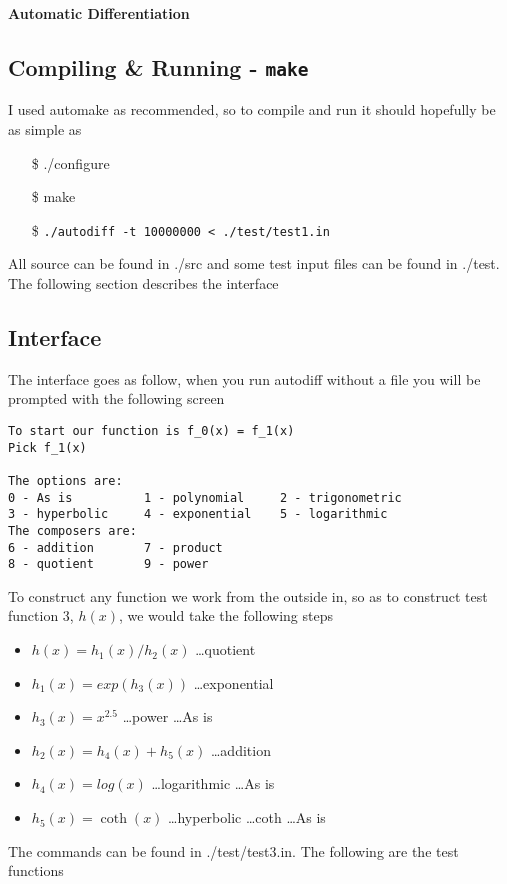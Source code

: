 \documentclass[11pt]{article}
\begin{document}
\vspace*{2mm}
\noindent
{\centering\textbf{\Large Automatic Differentiation}\\}
\vspace*{5mm}

\subsection*{Compiling \& Running - \texttt{make}}
I used automake as recommended, so to compile and run it should hopefully be as simple as
\begin{itemize}
\item[\$] ./configure
\item[\$] make
\item[\$] \texttt{./autodiff -t 10000000 < ./test/test1.in}  
\end{itemize}  
All source can be found in ./src and some test input files can be found in ./test. The following section describes the interface

\subsection*{Interface}

The interface goes as follow, when you run autodiff without a file you will be prompted with the following screen
\begin{lstlisting}[frame=single]
To start our function is f_0(x) = f_1(x)
Pick f_1(x)

The options are:
0 - As is          1 - polynomial     2 - trigonometric
3 - hyperbolic     4 - exponential    5 - logarithmic 
The composers are:
6 - addition       7 - product     
8 - quotient       9 - power 
\end{lstlisting}

To construct any function we work from the outside in, so as to construct test function 3, $h(x)$, we would take the following steps
\begin{itemize}
\item $h(x) = h_1(x)/h_2(x)$ \dots quotient
\item $h_1(x) = exp(h_3(x))$ \dots exponential
\item $h_3(x) = x^{2.5}$ \dots power \dots As is
\item $h_2(x) = h_4(x) + h_5(x)$ \dots addition
\item $h_4(x) = log(x)$ \dots logarithmic \dots As is
\item $h_5(x) = \coth(x)$ \dots hyperbolic \dots coth \dots As is
\end{itemize}
The commands can be found in ./test/test3.in. The following are the test functions
\end{document}
